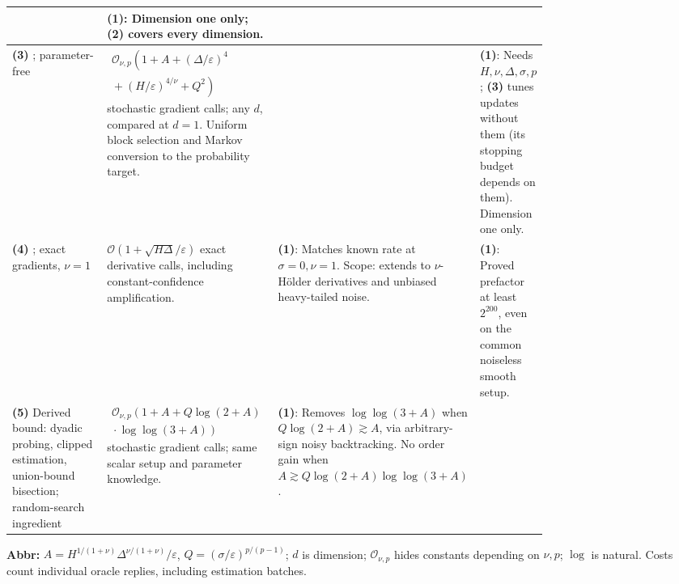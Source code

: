 \begin{table}[tp]
\begin{threeparttable}
\begin{tabularx}{\linewidth}{@{}>{\raggedright\arraybackslash}p{0.20\linewidth}>{\raggedright\arraybackslash}p{0.32\linewidth}>{\raggedright\arraybackslash}p{0.25\linewidth}>{\raggedright\arraybackslash}X@{}}
& \textbf{(1)}: Dimension one only; \textbf{(2)} covers every dimension. \\
\midrule
\textbf{(3)} \citep[Cor.~12, full version]{shsLiu2025v1}; parameter-free
& $\begin{gathered}\mathcal{O}_{\nu,p}\!\left(1+A+(\Delta/\varepsilon)^4\right.\\[-2pt]\left.{}+(H/\varepsilon)^{4/\nu}+Q^2\right)\end{gathered}$ stochastic gradient calls; any $d$, compared at $d=1$. Uniform block selection and Markov conversion to the probability target.
& & \textbf{(1)}: Needs $H,\nu,\Delta,\sigma,p$; \textbf{(3)} tunes updates without them (its stopping budget depends on them). Dimension one only. \\
\midrule
\textbf{(4)} \citep[Thm.~3]{shsChewi2023}; exact gradients, $\nu=1$
& $\mathcal{O}(1+\sqrt{H\Delta}/\varepsilon)$ exact derivative calls, including constant-confidence amplification.
& \textbf{(1)}: Matches known rate at $\sigma=0,\nu=1$. Scope: extends to $\nu$-H\"older derivatives and unbiased heavy-tailed noise.
& \textbf{(1)}: Proved prefactor at least $2^{200}$, even on the common noiseless smooth setup. \\
\midrule
\textbf{(5)} Derived bound: dyadic probing, clipped estimation, union-bound bisection; random-search ingredient \citep{shsChewi2023}
& $\begin{gathered}\mathcal{O}_{\nu,p}\!\left(1+A+Q\log(2+A)\right.\\[-2pt]\left.{}\cdot\log\log(3+A)\right)\end{gathered}$ stochastic gradient calls; same scalar setup and parameter knowledge.
& \textbf{(1)}: Removes $\log\log(3+A)$ when $Q\log(2+A)\gtrsim A$, via arbitrary-sign noisy backtracking. No order gain when $A\gtrsim Q\log(2+A)\log\log(3+A)$.
& \\
\bottomrule
\end{tabularx}
\begin{tablenotes}[flushleft]\footnotesize
\item[] \textbf{Abbr:} $A=H^{1/(1+\nu)}\Delta^{\nu/(1+\nu)}/\varepsilon$, $Q=(\sigma/\varepsilon)^{p/(p-1)}$; $d$ is dimension; $\mathcal{O}_{\nu,p}$ hides constants depending on $\nu,p$; $\log$ is natural. Costs count individual oracle replies, including estimation batches.
\end{tablenotes}
\end{threeparttable}
\end{table}
\clearpage
